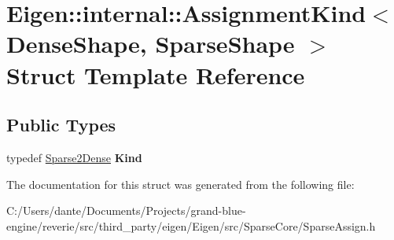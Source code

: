 \hypertarget{struct_eigen_1_1internal_1_1_assignment_kind_3_01_dense_shape_00_01_sparse_shape_01_4}{}\section{Eigen\+::internal\+::Assignment\+Kind$<$ Dense\+Shape, Sparse\+Shape $>$ Struct Template Reference}
\label{struct_eigen_1_1internal_1_1_assignment_kind_3_01_dense_shape_00_01_sparse_shape_01_4}
\subsection*{Public Types}
\begin{DoxyCompactItemize}
\item 
\mbox{\label{struct_eigen_1_1internal_1_1_assignment_kind_3_01_dense_shape_00_01_sparse_shape_01_4_a750527530f46241a2f8f979037a6ef98}} 
typedef \mbox{\hyperlink{struct_eigen_1_1internal_1_1_sparse2_dense}{Sparse2\+Dense}} {\bfseries Kind}
\end{DoxyCompactItemize}


The documentation for this struct was generated from the following file\+:\begin{DoxyCompactItemize}
\item 
C\+:/\+Users/dante/\+Documents/\+Projects/grand-\/blue-\/engine/reverie/src/third\+\_\+party/eigen/\+Eigen/src/\+Sparse\+Core/Sparse\+Assign.\+h\end{DoxyCompactItemize}
